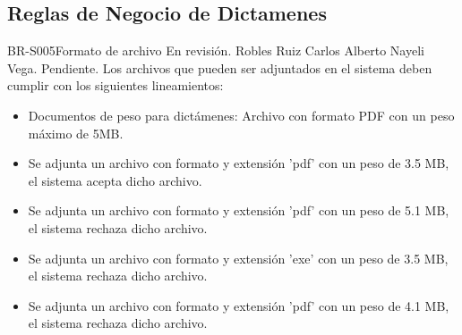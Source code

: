\subsection{Reglas de Negocio de Dictamenes}
%
%
\begin{BusinessRule}{BR-S005}{Formato de archivo}{\bcIntegridad}    %
	{\btEnabler}     %
	{\blControlling}    %
	\BRItem[Estado] En revisión.
	 Robles Ruiz Carlos Alberto
	 Nayeli Vega.
	 Pendiente.
	\BRItem[Descripción] Los archivos que pueden ser adjuntados en el sistema deben cumplir con los siguientes lineamientos:
		\begin{itemize}
			\item Documentos de peso para dictámenes: Archivo con formato PDF con un peso máximo de 5MB.
		\end{itemize}
	\begin{itemize}
		\item Se adjunta un archivo con formato y extensión 'pdf' con un peso de 3.5 MB, el sistema acepta dicho archivo.
		\item Se adjunta un archivo con formato y extensión 'pdf' con un peso de 5.1 MB, el sistema rechaza dicho archivo.
	\end{itemize}
	\begin{itemize}
		\item Se adjunta un archivo con formato y extensión 'exe' con un peso de 3.5 MB, el sistema rechaza dicho archivo.
		\item Se adjunta un archivo con formato y extensión 'pdf' con un peso de 4.1 MB, el sistema rechaza dicho archivo.
	\end{itemize}	
\end{BusinessRule}

